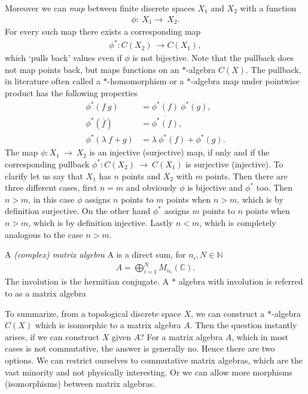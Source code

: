 Moreover we can \textit{map} between finite discrete spaces $X_1$ and $X_2$ with a
function
\begin{align}
    \phi:\ X_1 \rightarrow\ X_2.
\end{align}
For every such map there exists a corresponding map
\begin{align}
    \phi ^*:C(X_2)\ \rightarrow C(X_1),
\end{align}
which `pulls back' values even if $\phi$ is not bijective.
Note that the pullback does not map points back, but maps functions on an $*$-algebra $C(X)$.
The pullback, in literature often called a $*$-homomorphism or a $*$-algebra map under
pointwise product has the following properties
\begin{align}
    \phi ^*(f\ g) &= \phi ^*(f)\ \phi ^*(g),\\
    \phi ^*(\overline{f}) &= \overline{\phi ^*(f)},\\
    \phi ^*(\lambda\ f + g) &= \lambda\ \phi ^*(f) + \phi ^*(g).
\end{align}
    The map $\phi :X_1\ \rightarrow \ X_2$ is an injective (surjective) map,
    if only and if the corresponding pullback $\phi ^* :C(X_2)\ \rightarrow \
    C(X_1)$ is surjective (injective). To clarify let us say that $X_1$ has $n$ points and
    $X_2$ with $m$ points. Then there are three different cases, first $n=m$ and
    obviously $\phi$ is bijective and $\phi ^*$ too. Then $n >  m$, in this case
    $\phi$ assigns $n$ points to $m$ points when $n >  m$, which is by definition
    surjective. On the other hand $\phi ^*$ assigns $m$ points to $n$ points when
    $n >  m$, which is by definition injective. Lastly $n < m $, which is
    completely analogous to the case $n > m$.

\begin{mydefinition}
    A \textit{(complex) matrix algebra} A is a direct sum, for $n_i, N \in
    \mathbb{N}$
    \begin{align}
        A = \bigoplus _{i=1}^{N} M_{n_i}(\mathbb{C}).
    \end{align}
    The involution is the hermitian conjugate. A $*$ algebra with involution is referred to as
    a matrix algebra
\end{mydefinition}

To summarize, from a topological discrete space $X$, we can construct a
$*$-algebra $C(X)$ which is isomorphic to a matrix algebra $A$. Then the
question instantly arises, if we can construct $X$ given $A$? For a matrix
algebra $A$, which in most cases is not commutative, the answer is generally
no. Hence there are two options. We can restrict ourselves to commutative
matrix algebras, which are the vast minority and not physically interesting.
Or we can allow more morphisms (isomorphisms) between matrix algebras.

